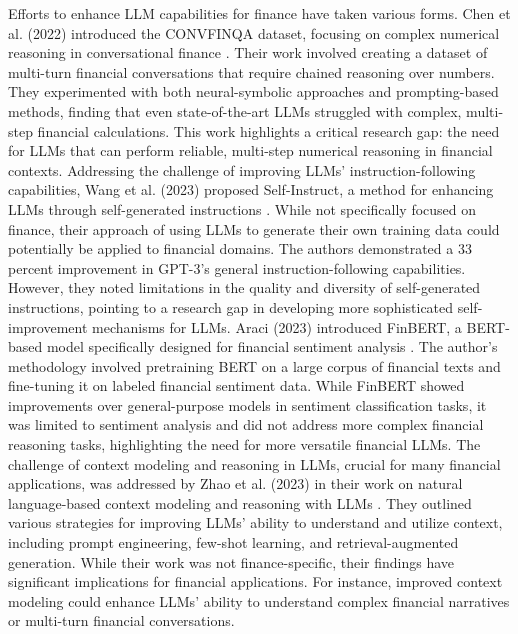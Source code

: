 \documentclass[logo,msc]{infthesis}           %
\begin{document}
Efforts to enhance LLM capabilities for finance have taken various forms. Chen et al. (2022) introduced the CONVFINQA dataset, focusing on complex numerical reasoning in conversational finance \cite{chen2022convfinqa}. Their work involved creating a dataset of multi-turn financial conversations that require chained reasoning over numbers. They experimented with both neural-symbolic approaches and prompting-based methods, finding that even state-of-the-art LLMs struggled with complex, multi-step financial calculations. This work highlights a critical research gap: the need for LLMs that can perform reliable, multi-step numerical reasoning in financial contexts.
Addressing the challenge of improving LLMs' instruction-following capabilities, Wang et al. (2023) proposed Self-Instruct, a method for enhancing LLMs through self-generated instructions \cite{wang2023selfinstruct}. While not specifically focused on finance, their approach of using LLMs to generate their own training data could potentially be applied to financial domains. The authors demonstrated a 33 percent improvement in GPT-3's general instruction-following capabilities. However, they noted limitations in the quality and diversity of self-generated instructions, pointing to a research gap in developing more sophisticated self-improvement mechanisms for LLMs.
Araci (2023) introduced FinBERT, a BERT-based model specifically designed for financial sentiment analysis \cite{araci2019finbertfinancialsentimentanalysis}. The author's methodology involved pretraining BERT on a large corpus of financial texts and fine-tuning it on labeled financial sentiment data. While FinBERT showed improvements over general-purpose models in sentiment classification tasks, it was limited to sentiment analysis and did not address more complex financial reasoning tasks, highlighting the need for more versatile financial LLMs.
The challenge of context modeling and reasoning in LLMs, crucial for many financial applications, was addressed by Zhao et al. (2023) in their work on natural language-based context modeling and reasoning with LLMs \cite{xiong2023naturallanguagebasedcontext}. They outlined various strategies for improving LLMs' ability to understand and utilize context, including prompt engineering, few-shot learning, and retrieval-augmented generation. While their work was not finance-specific, their findings have significant implications for financial applications. For instance, improved context modeling could enhance LLMs' ability to understand complex financial narratives or multi-turn financial conversations. 
\end{document}
